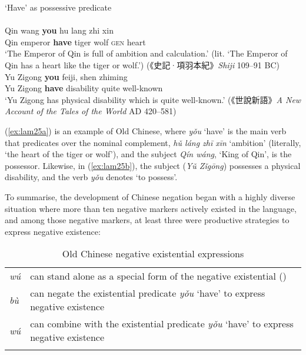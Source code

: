 \documentclass[output=paper]{langscibook}
\begin{document}
\ea `Have' as possessive predicate \label{ex:lam25}\\
  \label{ex:lam25a}\\
  	\gll Qin	wang \textbf{you} hu lang zhi xin\\
  	Qin	emperor	\textbf{have} tiger wolf \textsc{gen} heart\\
  	\glt `The Emperor of Qin is full of ambition and calculation.' (lit. `The Emperor of Qin has a heart like the tiger or wolf.') ({\cn《史記·項羽本紀》}\emph{Shiji} 109–91 BC)
   \label{ex:lam25b}\\
  	\gll Yu Zigong \textbf{you} feiji, shen zhiming\\
  	Yu Zigong \textbf{have} disability quite	well-known\\
  	\glt `Yu Zigong has physical disability which is quite well-known.' ({\cn《世說新語》}\emph{A New Account of the Tales of the World} AD 420–581)
\z \z

(\ref{ex:lam25a}) is an example of Old Chinese, where \textit{yǒu} `have' is the main verb that predicates over the nominal complement, \textit{hǔ láng zhī xīn} `ambition' (literally, `the heart of the tiger or wolf'), and the subject \textit{Qín wáng}, `King of Qin', is the possessor. Likewise, in (\ref{ex:lam25b}), the subject (\emph{Yǔ Zǐgōng}) possesses a physical disability, and the verb \textit{yǒu} denotes `to possess'. 

To summarise, the development of Chinese negation began with a highly diverse situation where more than ten negative markers actively existed in the language, and among those negative markers, at least three were productive strategies to express negative existence:


\begin{table}
  \begin{tabularx}{\textwidth}{lQ}
    \lsptoprule
\textit{wú} & can stand alone as a special form of the negative existential (\citealt{Zhang2002})\\
\textit{bù} & can negate the existential predicate \textit{yǒu} `have' to express negative existence\\ 
\textit{wú} & can combine with the existential predicate \textit{yǒu} `have' to express negative existence\\
\lspbottomrule
\end{tabularx}
  \caption{Old Chinese negative existential expressions}
  \label{ex:lam26}
\end{table}
\end{document}
